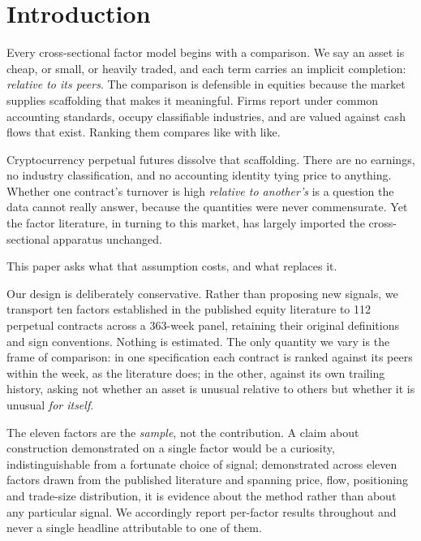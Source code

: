 \documentclass[11pt,letterpaper]{article}
\begin{document}
\thispagestyle{empty}
\newpage
\setcounter{page}{1}

\section{Introduction}

Every cross-sectional factor model begins with a comparison. We say an asset is
cheap, or small, or heavily traded, and each term carries an implicit completion:
\emph{relative to its peers}. The comparison is defensible in equities because
the market supplies scaffolding that makes it meaningful. Firms report under
common accounting standards, occupy classifiable industries, and are valued
against cash flows that exist. Ranking them compares like with like.

Cryptocurrency perpetual futures dissolve that scaffolding. There are no
earnings, no industry classification, and no accounting identity tying price to
anything. Whether one contract's turnover is high \emph{relative to another's} is
a question the data cannot really answer, because the quantities were never
commensurate. Yet the factor literature, in turning to this market, has largely
imported the cross-sectional apparatus unchanged.

This paper asks what that assumption costs, and what replaces it.

Our design is deliberately conservative. Rather than proposing new signals, we
transport ten factors established in the published equity literature to 112
perpetual contracts across a 363-week panel, retaining their original definitions
and sign conventions. Nothing is estimated. The only quantity we vary is the
frame of comparison: in one specification each contract is ranked against its
peers within the week, as the literature does; in the other, against its own
trailing history, asking not whether an asset is unusual relative to others but
whether it is unusual \emph{for itself}.

The eleven factors are the \emph{sample}, not the contribution. A claim about
construction demonstrated on a single factor would be a curiosity, indistinguishable
from a fortunate choice of signal; demonstrated across eleven factors drawn from
the published literature and spanning price, flow, positioning and trade-size
distribution, it is evidence about the method rather than about any particular
signal. We accordingly report per-factor results throughout and never a single
headline attributable to one of them.
\end{document}
